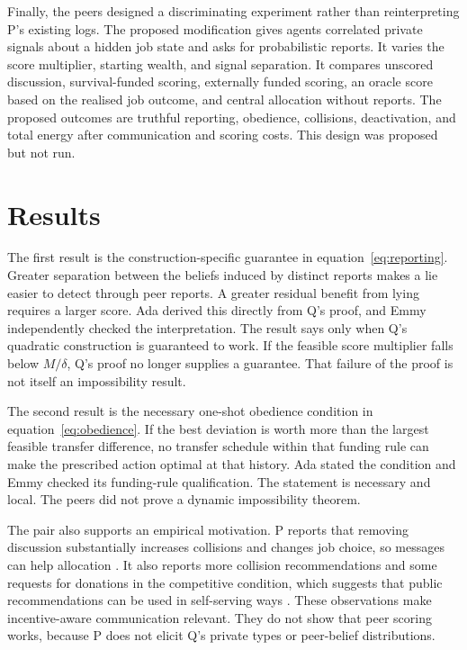 \documentclass{article}
\begin{document}
Finally, the peers designed a discriminating experiment rather than reinterpreting P's existing logs.  The proposed modification gives agents correlated private signals about a hidden job state and asks for probabilistic reports.  It varies the score multiplier, starting wealth, and signal separation.  It compares unscored discussion, survival-funded scoring, externally funded scoring, an oracle score based on the realised job outcome, and central allocation without reports.  The proposed outcomes are truthful reporting, obedience, collisions, deactivation, and total energy after communication and scoring costs.  This design was proposed but not run.

\section{Results}

The first result is the construction-specific guarantee in equation~\ref{eq:reporting}.  Greater separation between the beliefs induced by distinct reports makes a lie easier to detect through peer reports.  A greater residual benefit from lying requires a larger score.  Ada derived this directly from Q's proof, and Emmy independently checked the interpretation.  The result says only when Q's quadratic construction is guaranteed to work.  If the feasible score multiplier falls below $M/\delta$, Q's proof no longer supplies a guarantee.  That failure of the proof is not itself an impossibility result.

The second result is the necessary one-shot obedience condition in equation~\ref{eq:obedience}.  If the best deviation is worth more than the largest feasible transfer difference, no transfer schedule within that funding rule can make the prescribed action optimal at that history.  Ada stated the condition and Emmy checked its funding-rule qualification.  The statement is necessary and local.  The peers did not prove a dynamic impossibility theorem.

The pair also supports an empirical motivation.  P reports that removing discussion substantially increases collisions and changes job choice, so messages can help allocation \cite{P}.  It also reports more collision recommendations and some requests for donations in the competitive condition, which suggests that public recommendations can be used in self-serving ways \cite{P}.  These observations make incentive-aware communication relevant.  They do not show that peer scoring works, because P does not elicit Q's private types or peer-belief distributions.
\end{document}
